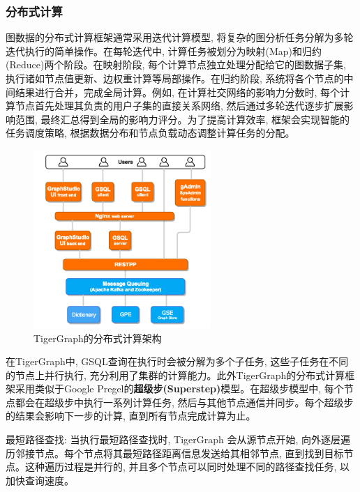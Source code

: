 \subsubsection{分布式计算}
图数据的分布式计算框架通常采用迭代计算模型, 将复杂的图分析任务分解为多轮迭代执行的简单操作。在每轮迭代中, 计算任务被划分为映射(Map)和归约(Reduce)两个阶段。在映射阶段, 每个计算节点独立处理分配给它的图数据子集, 执行诸如节点值更新、边权重计算等局部操作。在归约阶段, 系统将各个节点的中间结果进行合并，完成全局计算。例如, 在计算社交网络的影响力分数时, 每个计算节点首先处理其负责的用户子集的直接关系网络, 然后通过多轮迭代逐步扩展影响范围, 最终汇总得到全局的影响力评分。为了提高计算效率, 框架会实现智能的任务调度策略, 根据数据分布和节点负载动态调整计算任务的分配。
\begin{figure}[H]
	\centering
	\includegraphics[width=0.6\textwidth]{images/25.png}
	\caption{TigerGraph的分布式计算架构}
	\label{fig:tigergraph}
\end{figure}
在TigerGraph中, GSQL查询在执行时会被分解为多个子任务, 这些子任务在不同的节点上并行执行, 充分利用了集群的计算能力。此外TigerGraph的分布式计算框架采用类似于Google Pregel的\textbf{超级步(Superstep)}模型。在超级步模型中, 每个节点都会在超级步中执行一系列计算任务, 然后与其他节点通信并同步。每个超级步的结果会影响下一步的计算, 直到所有节点完成计算为止。

最短路径查找: 当执行最短路径查找时, TigerGraph 会从源节点开始, 向外逐层遍历邻接节点。每个节点将其最短路径距离信息发送给其相邻节点, 直到找到目标节点。这种遍历过程是并行的, 并且多个节点可以同时处理不同的路径查找任务, 以加快查询速度。